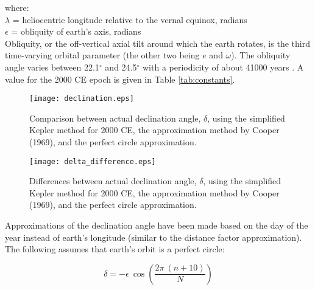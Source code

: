 \noindent where: \\
\indent $\lambda$ = heliocentric longitude relative to the vernal equinox, radians\\
\indent $\epsilon$ = obliquity of earth's axis, radians\\

Obliquity, or the off-vertical axial tilt around which the earth rotates, is the third time-varying orbital parameter (the other two being $e$ and $\omega$).  
The obliquity angle varies between 22.1$^{\circ}$ and 24.5$^{\circ}$ with a periodicity of about 41000 years \parencite{hays76}. 
A value for the 2000 CE epoch is given in Table \ref{tab:constants}.

\begin{figure}[ht!]
    \texttt{[image: declination.eps]}
    \caption{Comparison between actual declination angle, $\delta$, using the simplified Kepler method for 2000 CE, the approximation method by Cooper (1969), and the perfect circle approximation.}
    \label{fig:delta}
\end{figure}

\begin{figure}[ht!]
    \texttt{[image: delta\_difference.eps]}
    \caption{Differences between actual declination angle, $\delta$, using the simplified Kepler method for 2000 CE, the approximation method by Cooper (1969), and the perfect circle approximation.}
    \label{fig:ddiff}
\end{figure}

Approximations of the declination angle have been made based on the day of the year instead of earth's longitude (similar to the distance factor approximation). 
The following assumes that earth's orbit is a perfect circle:

\begin{equation}
\label{eq:deltab}
    \delta = -\epsilon\:\cos\left(\frac{2\pi\:(n+10)}{N} \right)
\end{equation}

